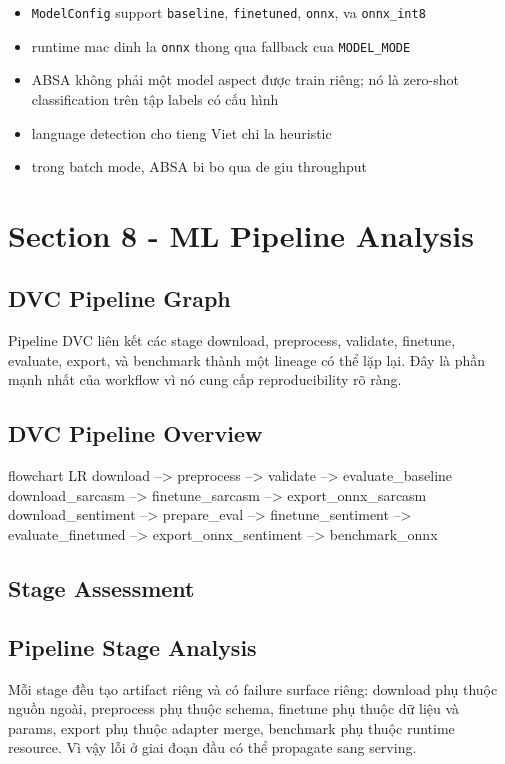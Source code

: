 \begin{itemize}[leftmargin=1.2em]
  \item \texttt{ModelConfig} support \texttt{baseline}, \texttt{finetuned}, \texttt{onnx}, va \texttt{onnx\_int8}
  \item runtime mac dinh la \texttt{onnx} thong qua fallback cua \texttt{MODEL\_MODE}
  \item ABSA không phải một model aspect được train riêng; nó là zero-shot classification trên tập labels có cấu hình
  \item language detection cho tieng Viet chi la heuristic
  \item trong batch mode, ABSA bi bo qua de giu throughput
\end{itemize}

\section{Section 8 - ML Pipeline Analysis}
\subsection{DVC Pipeline Graph}
Pipeline DVC liên kết các stage download, preprocess, validate, finetune, evaluate, export, và benchmark thành một lineage có thể lặp lại. Đây là phần mạnh nhất của workflow vì nó cung cấp reproducibility rõ ràng.

\subsection{DVC Pipeline Overview}
\begin{mermaidblock}
flowchart LR
  download --> preprocess --> validate --> evaluate_baseline
  download_sarcasm --> finetune_sarcasm --> export_onnx_sarcasm
  download_sentiment --> prepare_eval --> finetune_sentiment --> evaluate_finetuned --> export_onnx_sentiment --> benchmark_onnx
\end{mermaidblock}

\subsection{Stage Assessment}
\subsection{Pipeline Stage Analysis}
Mỗi stage đều tạo artifact riêng và có failure surface riêng: download phụ thuộc nguồn ngoài, preprocess phụ thuộc schema, finetune phụ thuộc dữ liệu và params, export phụ thuộc adapter merge, benchmark phụ thuộc runtime resource. Vì vậy lỗi ở giai đoạn đầu có thể propagate sang serving.

